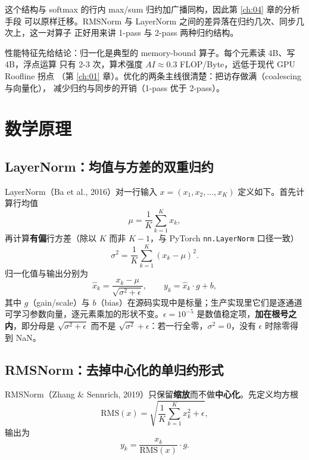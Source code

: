 这个结构与 softmax 的行内 max/sum 归约加广播同构，因此第 \ref{ch:04} 章的分析手段
可以原样迁移。RMSNorm 与 LayerNorm 之间的差异落在归约几次、同步几次上，这一对算子
正好用来讲 1-pass 与 2-pass 两种归约结构。

性能特征先给结论：归一化是典型的 memory-bound 算子。每个元素读 4B、写 4B，浮点运算
只有 2-3 次，算术强度 $AI \approx 0.3$ FLOP/Byte，远低于现代 GPU Roofline 拐点
（第 \ref{ch:01} 章）。优化的两条主线很清楚：把访存做满（coalescing 与向量化），
减少归约与同步的开销（1-pass 优于 2-pass）。

\section{数学原理}

\subsection{LayerNorm：均值与方差的双重归约}

LayerNorm（Ba et al., 2016）对一行输入 $x = (x_1, x_2, \dots, x_K)$ 定义如下。首先计算行均值
\begin{equation}
  \mu = \frac{1}{K}\sum_{k=1}^{K} x_k ,
\end{equation}
再计算\textbf{有偏}行方差（除以 $K$ 而非 $K-1$，与 PyTorch \texttt{nn.\allowbreak{}Layer\allowbreak{}Norm} 口径一致）
\begin{equation}
  \sigma^2 = \frac{1}{K}\sum_{k=1}^{K}\left(x_k - \mu\right)^2 .
\end{equation}
归一化值与输出分别为
\begin{equation}
  \hat{x}_k = \frac{x_k - \mu}{\sqrt{\sigma^2 + \epsilon}}, \qquad
  y_k = \hat{x}_k \cdot g + b ,
  \label{eq:ch06-ln}
\end{equation}
其中 $g$（gain/scale）与 $b$（bias）在源码实现中是标量；生产实现里它们是逐通道可学习参数向量，逐元素乘加的形状不变。$\epsilon = 10^{-5}$ 是数值稳定项，\textbf{加在根号之内}，即分母是 $\sqrt{\sigma^2 + \epsilon}$ 而不是 $\sqrt{\sigma^2} + \epsilon$：若一行全零，$\sigma^2=0$，没有 $\epsilon$ 时除零得到 NaN。

\subsection{RMSNorm：去掉中心化的单归约形式}

RMSNorm（Zhang \& Sennrich, 2019）只保留\textbf{缩放}而不做\textbf{中心化}。先定义均方根
\begin{equation}
  \mathrm{RMS}(x) = \sqrt{\frac{1}{K}\sum_{k=1}^{K} x_k^2 + \epsilon},
\end{equation}
输出为
\begin{equation}
  y_k = \frac{x_k}{\mathrm{RMS}(x)} \cdot g .
  \label{eq:ch06-rms}
\end{equation}

